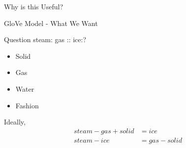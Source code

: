 \begin{frame}{Why is this Useful?}
\end{frame}
\begin{frame}{GloVe Model - What We Want}
  \begin{exampleblock}{Question}
    steam: gas :: ice:?
    \pause
    \begin{itemize}[<+->]
    \item Solid
    \item Gas
    \item Water
    \item Fashion
    \end{itemize}
  \end{exampleblock}
  Ideally,
  \begin{align*} 
  steam - gas + solid &= ice \\
  steam - ice &= gas - solid \\
  \end{align*}
\end{frame}


